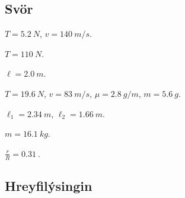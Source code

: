 \ifdefined \wholebook \else\documentclass[oneside]{book}\usepackage{EdlBook}\graphicspath{{figures/}}
\begin{document}
\begin{enumerate}[label = \textbf{Dæmi \thechapter.\arabic*.}]

\end{enumerate}

\subsection*{Svör}

\begin{enumerate*}[label = \vspace{0.15cm} \textbf{(\arabic*)}]
  \item $T = \SI{5.2}{N}$, $v = \SI{140}{m/s}$.
  \item $T = \SI{110}{N}$.
  \item $\ell = \SI{2.0}{m}$.
  \item $T = \SI{19.6}{N}$, $v = \SI{83}{m/s}$, $\mu = \SI{2.8}{g/m}$, $m = \SI{5.6}{g}$.
  \item $\ell_1 = \SI{2.34}{m}$, $\ell_2 = \SI{1.66}{m}$.
  \item $m = \SI{16.1}{kg}$.
  \item $\frac{r}{R} = \SI{0.31}{}$.
\end{enumerate*}


\newpage 

\subsection*{Hreyfilýsingin}
\end{document}
